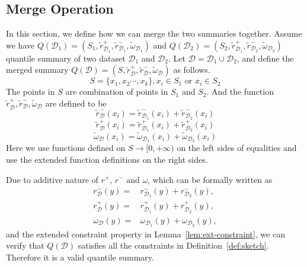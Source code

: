 \documentclass{sig-alternate-05-2015}
\newcommand{\Rplus}{[0, +\infty)}
\newcommand{\w}{\omega}
\newcommand{\sD}{\mathcal{D}}
\newcommand{\tdr}{\tilde{r}_{\sD}}
\newcommand{\tdrx}[1]{\tilde{r}_{\sD_{#1}}}
\newcommand{\tdw}{\tilde{\omega}_{\sD}}
\newcommand{\tdwx}[1]{\tilde{\omega}_{\sD_{#1}}}
\begin{document}
\subsection{Merge Operation}
In this section, we define how we can merge the two summaries together. Assume we have $Q(\sD_1) =(S_1, \tdrx{1}^+, \tdrx{1}^-, \tdwx{1})$ and  $Q(\sD_2) =(S_2, \tdrx{1}^+, \tdrx{2}^-, \tdwx{2})$ quantile summary of two dataset $\sD_1$ and $\sD_2$. Let $\sD = \sD_1 \cup \sD_2$, and define the merged summary $Q(\sD)=(S, \tdr^+, \tdr^-, \tdw)$ as follows.
\begin{equation}
S=\{x_1, x_2\cdots, x_k\}, x_i \in S_1 \mbox{ or } x_i \in S_2
\end{equation}
The points in $S$ are combination of points in $S_1$ and $S_2$. And the function $\tdr^+, \tdr^-,\tdw$ are defined to be
\begin{equation}
\tdr^-(x_i) = \tdrx{1}^-(x_i) + \tdrx{2}^-(x_i)
\end{equation}
\begin{equation}
\tdr^+(x_i) = \tdrx{1}^+(x_i) + \tdrx{2}^+(x_i)
\end{equation}
\begin{equation}
\tdw(x_i) =\tdwx{1}(x_i)+ \tdwx{2}(x_{i})
\end{equation}
Here we use functions defined on $S\rightarrow \Rplus$ on the left sides of equalities
and use the  extended function definitions on the right sides.

Due to additive nature of $r^+$, $r^-$ and $\w$, which can be formally written as
\begin{equation}
\begin{split}
r^-_{\sD}(y) =&r^-_{\sD_1}(y)+ r^-_{\sD_2}(y),\\
 r^+_{\sD}(y) =&r^+_{\sD_1}(y)+ r^+_{\sD_2}(y),\\
  \w_{\sD}(y) =&\w_{\sD_1}(y)+ \w_{\sD_2}(y),
\end{split}
\end{equation}
and the extended constraint property in Lemma~\ref{lem:ext-constraint}, we can verify that
$Q(\sD)$ satisfies all the constraints in Definition~\ref{def:sketch}. Therefore it is a valid quantile summary.
\end{document}
